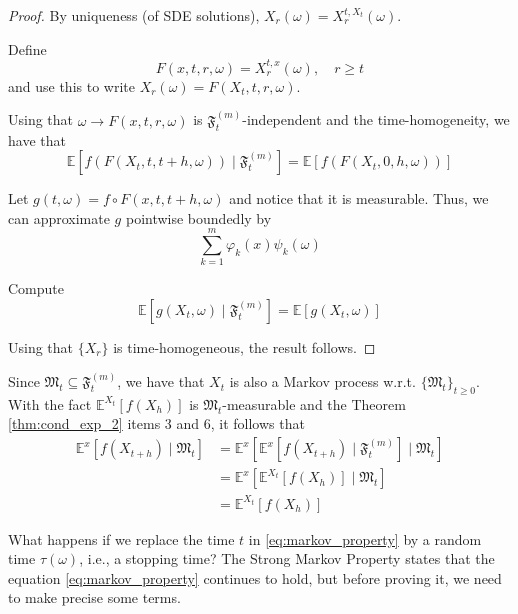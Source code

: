 \begin{proof}
    By uniqueness (of SDE solutions), $X_r(\omega) = X_r^{t, X_t}(\omega)$. 

    Define 
    \[
        F(x, t, r, \omega) = X_r^{t,x}(\omega), \quad r \geq t
    \]
    and use this to write $X_r(\omega) = F(X_t, t, r, \omega)$. 

    Using that $\omega \longrightarrow F(x, t, r, \omega)$ is $\mathfrak{F}_t^{(m)}$-independent and the time-homogeneity, we have that 
    \[
        \mathbb{E}[f(F(X_t, t, t+h, \omega)) \mid \mathfrak{F}_t^{(m)}] = \mathbb{E}[f(F(X_t, 0, h, \omega))]
    \]

    Let $g(t, \omega) = f \circ F(x, t, t+h, \omega)$ and notice that it is measurable. Thus, we can approximate $g$ pointwise boundedly by 
    \[
        \sum_{k=1}^{m} \varphi_k(x) \psi_k(\omega)
    \]

    Compute 
    \[
        \mathbb{E}[g(X_t, \omega) \mid \mathfrak{F}_t^{(m)}] = \mathbb{E}[g(X_t, \omega)]
    \]

    Using that $\{ X_r \}$ is time-homogeneous, the result follows. 
\end{proof}


\begin{remark}
    Since $\mathfrak{M}_t \subseteq \mathfrak{F}_t^{(m)}$, we have that $X_t$ is also a Markov process w.r.t. $\{ \mathfrak{M}_t \}_{t \geq 0}$. With the fact $\mathbb{E}^{X_t} [f(X_{h})]$ is $\mathfrak{M}_t$-measurable and the Theorem \ref{thm:cond_exp_2} items 3 and 6, it follows that 
    \begin{equation*}
        \begin{aligned}
            \mathbb{E}^x [ f(X_{t+h}) \mid \mathfrak{M}_t] &= \mathbb{E}^x[ \mathbb{E}^x [f(X_{t+h}) \mid \mathfrak{F}_t^{(m)}] \mid \mathfrak{M}_t] \\
            &= \mathbb{E}^x[\mathbb{E}^{X_t} [f(X_{h})] \mid \mathfrak{M}_t] \\ 
            &= \mathbb{E}^{X_t} [f(X_{h})]
        \end{aligned}
    \end{equation*}
\end{remark}

What happens if we replace the time $t$ in \eqref{eq:markov_property} by a random time $\tau(\omega)$, i.e., a stopping time? The Strong Markov Property states that the equation \eqref{eq:markov_property} continues to hold, but before proving it, we need to make precise some terms.

